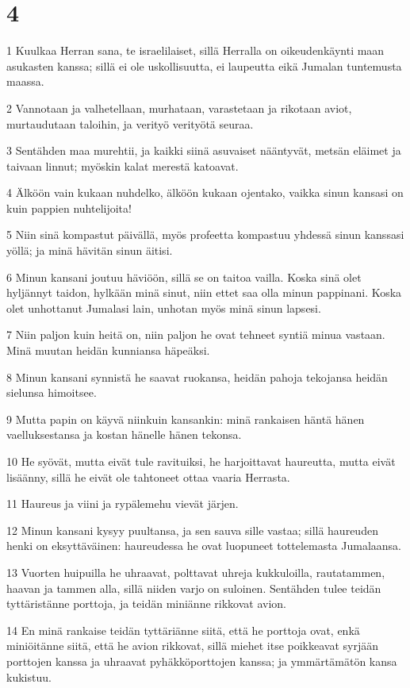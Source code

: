 \chapter{4}

\par 1 Kuulkaa Herran sana, te israelilaiset, sillä Herralla on oikeudenkäynti maan asukasten kanssa; sillä ei ole uskollisuutta, ei laupeutta eikä Jumalan tuntemusta maassa.
\par 2 Vannotaan ja valhetellaan, murhataan, varastetaan ja rikotaan aviot, murtaudutaan taloihin, ja verityö verityötä seuraa.
\par 3 Sentähden maa murehtii, ja kaikki siinä asuvaiset nääntyvät, metsän eläimet ja taivaan linnut; myöskin kalat merestä katoavat.
\par 4 Älköön vain kukaan nuhdelko, älköön kukaan ojentako, vaikka sinun kansasi on kuin pappien nuhtelijoita!
\par 5 Niin sinä kompastut päivällä, myös profeetta kompastuu yhdessä sinun kanssasi yöllä; ja minä hävitän sinun äitisi.
\par 6 Minun kansani joutuu häviöön, sillä se on taitoa vailla. Koska sinä olet hyljännyt taidon, hylkään minä sinut, niin ettet saa olla minun pappinani. Koska olet unhottanut Jumalasi lain, unhotan myös minä sinun lapsesi.
\par 7 Niin paljon kuin heitä on, niin paljon he ovat tehneet syntiä minua vastaan. Minä muutan heidän kunniansa häpeäksi.
\par 8 Minun kansani synnistä he saavat ruokansa, heidän pahoja tekojansa heidän sielunsa himoitsee.
\par 9 Mutta papin on käyvä niinkuin kansankin: minä rankaisen häntä hänen vaelluksestansa ja kostan hänelle hänen tekonsa.
\par 10 He syövät, mutta eivät tule ravituiksi, he harjoittavat haureutta, mutta eivät lisäänny, sillä he eivät ole tahtoneet ottaa vaaria Herrasta.
\par 11 Haureus ja viini ja rypälemehu vievät järjen.
\par 12 Minun kansani kysyy puultansa, ja sen sauva sille vastaa; sillä haureuden henki on eksyttäväinen: haureudessa he ovat luopuneet tottelemasta Jumalaansa.
\par 13 Vuorten huipuilla he uhraavat, polttavat uhreja kukkuloilla, rautatammen, haavan ja tammen alla, sillä niiden varjo on suloinen. Sentähden tulee teidän tyttäristänne porttoja, ja teidän miniänne rikkovat avion.
\par 14 En minä rankaise teidän tyttäriänne siitä, että he porttoja ovat, enkä miniöitänne siitä, että he avion rikkovat, sillä miehet itse poikkeavat syrjään porttojen kanssa ja uhraavat pyhäkköporttojen kanssa; ja ymmärtämätön kansa kukistuu.
